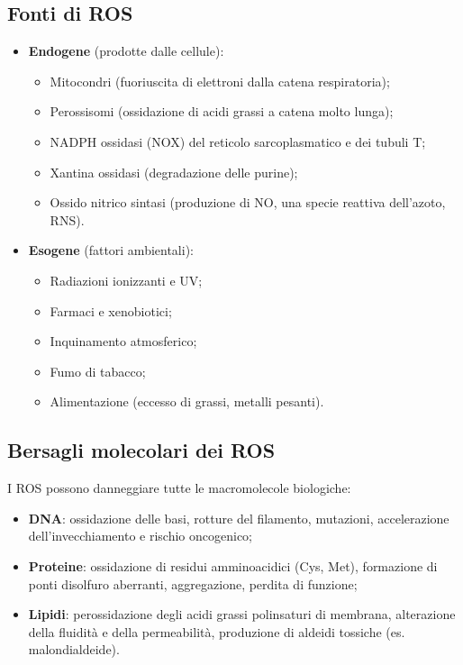 \documentclass[12pt,a4paper]{report}
\begin{document}
\subsection{Fonti di ROS}
\begin{itemize}
\item \textbf{Endogene} (prodotte dalle cellule):
\begin{itemize}
\item Mitocondri (fuoriuscita di elettroni dalla catena respiratoria);
\item Perossisomi (ossidazione di acidi grassi a catena molto lunga);
\item NADPH ossidasi (NOX) del reticolo sarcoplasmatico e dei tubuli T;
\item Xantina ossidasi (degradazione delle purine);
\item Ossido nitrico sintasi (produzione di NO, una specie reattiva dell'azoto, RNS).
\end{itemize}
\item \textbf{Esogene} (fattori ambientali):
\begin{itemize}
\item Radiazioni ionizzanti e UV;
\item Farmaci e xenobiotici;
\item Inquinamento atmosferico;
\item Fumo di tabacco;
\item Alimentazione (eccesso di grassi, metalli pesanti).
\end{itemize}
\end{itemize}

\subsection{Bersagli molecolari dei ROS}
I ROS possono danneggiare tutte le macromolecole biologiche:
\begin{itemize}
\item \textbf{DNA}: ossidazione delle basi, rotture del filamento, mutazioni, accelerazione dell'invecchiamento e rischio oncogenico;
\item \textbf{Proteine}: ossidazione di residui amminoacidici (Cys, Met), formazione di ponti disolfuro aberranti, aggregazione, perdita di funzione;
\item \textbf{Lipidi}: perossidazione degli acidi grassi polinsaturi di membrana, alterazione della fluidità e della permeabilità, produzione di aldeidi tossiche (es. malondialdeide).
\end{itemize}
\end{document}
